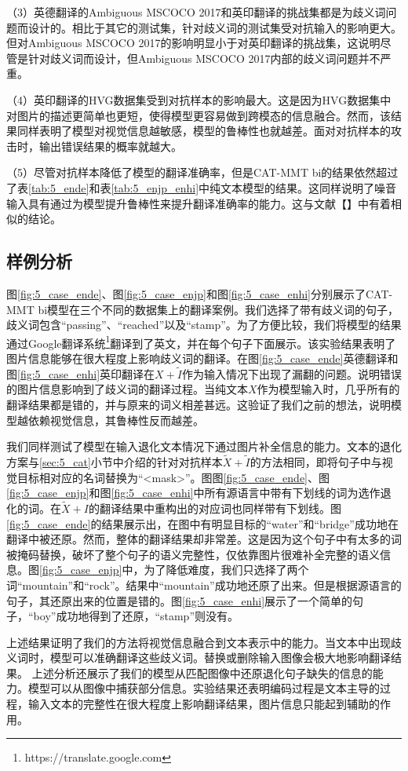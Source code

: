 （3）英德翻译的Ambiguous MSCOCO 2017和英印翻译的挑战集都是为歧义词问题而设计的。相比于其它的测试集，针对歧义词的测试集受对抗输入的影响更大。但对Ambiguous MSCOCO 2017的影响明显小于对英印翻译的挑战集，这说明尽管是针对歧义词而设计，但Ambiguous MSCOCO 2017内部的歧义词问题并不严重。

（4）英印翻译的HVG数据集受到对抗样本的影响最大。这是因为HVG数据集中对图片的描述更简单也更短，使得模型更容易做到跨模态的信息融合。然而，该结果同样表明了模型对视觉信息越敏感，模型的鲁棒性也就越差。面对对抗样本的攻击时，输出错误结果的概率就越大。

（5）尽管对抗样本降低了模型的翻译准确率，但是CAT-MMT bi的结果依然超过了表\ref{tab:5_ende}和表\ref{tab:5_enjp_enhi}中纯文本模型的结果。这同样说明了噪音输入具有通过为模型提升鲁棒性来提升翻译准确率的能力。这与文献【】中有着相似的结论。


\subsection{样例分析}



图\ref{fig:5_case_ende}、图\ref{fig:5_case_enjp}和图\ref{fig:5_case_enhi}分别展示了CAT-MMT bi模型在三个不同的数据集上的翻译案例。我们选择了带有歧义词的句子，歧义词包含“passing”、“reached”以及“stamp”。为了方便比较，我们将模型的结果通过Google翻译系统\footnote{https://translate.google.com}翻译到了英文，并在每个句子下面展示。该实验结果表明了图片信息能够在很大程度上影响歧义词的翻译。在图\ref{fig:5_case_ende}英德翻译和图\ref{fig:5_case_enhi}英印翻译在$X+\tilde{I}$作为输入情况下出现了漏翻的问题。说明错误的图片信息影响到了歧义词的翻译过程。当纯文本$X$作为模型输入时，几乎所有的翻译结果都是错的，并与原来的词义相差甚远。这验证了我们之前的想法，说明模型越依赖视觉信息，其鲁棒性反而越差。

我们同样测试了模型在输入退化文本情况下通过图片补全信息的能力。文本的退化方案与\ref{sec:5_cat}小节中介绍的针对对抗样本$\tilde{X}+\tilde{I}$的方法相同，即将句子中与视觉目标相对应的名词替换为“<mask>”。图图\ref{fig:5_case_ende}、图\ref{fig:5_case_enjp}和图\ref{fig:5_case_enhi}中所有源语言中带有下划线的词为选作退化的词。在$\tilde{X}+I$的翻译结果中重构出的对应词也同样带有下划线。图\ref{fig:5_case_ende}的结果展示出，在图中有明显目标的“water”和“bridge”成功地在翻译中被还原。然而，整体的翻译结果却非常差。这是因为这个句子中有太多的词被掩码替换，破坏了整个句子的语义完整性，仅依靠图片很难补全完整的语义信息。图\ref{fig:5_case_enjp}中，为了降低难度，我们只选择了两个词“mountain”和“rock”。结果中“mountain”成功地还原了出来。但是根据源语言的句子，其还原出来的位置是错的。图\ref{fig:5_case_enhi}展示了一个简单的句子，“boy”成功地得到了还原，“stamp”则没有。

上述结果证明了我们的方法将视觉信息融合到文本表示中的能力。当文本中出现歧义词时，模型可以准确翻译这些歧义词。替换或删除输入图像会极大地影响翻译结果。
上述分析还展示了我们的模型从匹配图像中还原退化句子缺失的信息的能力。模型可以从图像中捕获部分信息。实验结果还表明编码过程是文本主导的过程，输入文本的完整性在很大程度上影响翻译结果，图片信息只能起到辅助的作用。